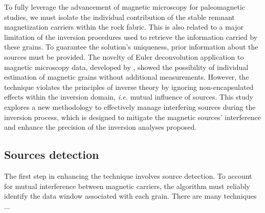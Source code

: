 


To fully leverage the advancement of magnetic microscopy for paleomagnetic studies, we must isolate the individual contribution of the stable remnant magnetization carriers within the rock fabric. This is also related to a major limitation of the inversion procedures used to retrieve the information carried by these grains. To guarantee the solution's uniqueness, prior information about the sources must be provided. The novelty of Euler deconvolution application to magnetic microscopy data, developed by \citet{Souza-Junior2023b}, showed the possibility of individual estimation of magnetic grains without additional measurements. However, the technique violates the principles of inverse theory by ignoring non-encapsulated effects within the inversion domain, \textit{i.e.} mutual influence of sources. This study explores a new methodology to effectively manage interfering sources during the inversion process, which is designed to mitigate the magnetic sources' interference and enhance the precision of the inversion analyses proposed.

\subsection{Sources detection}
The first step in enhancing the technique involves source detection. To account for mutual interference between magnetic carriers, the algorithm must reliably identify the data window associated with each grain. There are many techniques ...
 
